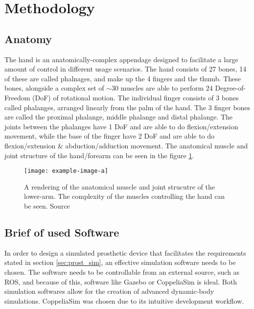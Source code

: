 \documentclass[../main.tex]{subfiles}
\begin{document}
\section{Methodology}

\subsection{Anatomy}
\label{sec:anatomy}

The hand is an anatomically-complex appendage designed to facilitate a large amount of control in different usage scenarios.
The hand consists of 27 bones, 14 of these are called phalnages, and make up the 4 fingers and the thumb.
These bones, alongside a complex set of $\sim30$ muscles are able to perform $24$ Degree-of-Freedom (DoF) of rotational motion.
The individual finger consists of 3 bones called \gls{phalanges}, arranged linearly from the palm of the hand.
The 3 finger bones are called the proximal phalange, middle phalange and distal phalange.
The joints between the phalanges have 1 DoF and are able to do \gls{flexion/extension} movement, while the base of the finger have 2 DoF and are able to do \gls{flexion/extension} \& \gls{abduction/adduction} movement.
The anatomical muscle and joint structure of the hand/forearm can be seen in the figure \ref{fig:anatomy}.

\begin{figure}[h]
\begin{center}
\texttt{[image: example-image-a]}
\caption{A rendering of the anatomical muscle and joint strucutre of the lower-arm. The complexity of the muscles controlling the hand can be seen. Source \cite{???}}
\label{fig:anatomy}
\end{center}
\end{figure}

\subsection{Brief of used Software}
\label{sec:software}

In order to design a simulated prosthetic device that facilitates the requirements stated in section \ref{sec:prost_sim}, an effective simulation software needs to be chosen.
The software needs to be controllable from an external source, such as ROS, and because of this, software like Gazebo \cite{gazebo} or CoppeliaSim \cite{coppeliasim} is ideal.
Both simulation softwares allow for the creation of advanced dynamic-body simulations.
CoppeliaSim \cite{coppeliasim} was chosen due to its intuitive development workflow.
\end{document}
